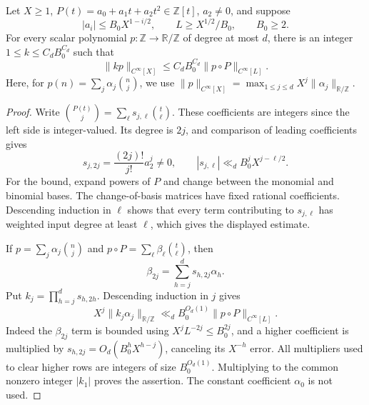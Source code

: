\begin{lemma}\label{lem:gn-quadratic-coefficients}
Let $X\geq1$, $P(t)=a_0+a_1t+a_2t^2\in\mathbb Z[t]$, $a_2\ne0$, and suppose
\[
 |a_i|\leq B_0X^{1-i/2},\qquad
 L\geq X^{1/2}/B_0,\qquad B_0\geq2.
\]
For every scalar polynomial $p:\mathbb Z\to\mathbb R/\mathbb Z$ of
degree at most $d$, there is an integer $1\leq k\leq C_dB_0^{C_d}$ such
that
\[
 \|kp\|_{C^\infty[X]}
   \leq C_dB_0^{C_d}\|p\circ P\|_{C^\infty[L]}.
\]
Here, for $p(n)=\sum_j\alpha_j\binom nj$, we use
$\|p\|_{C^\infty[X]}=\max_{1\leq j\leq d}X^j
\|\alpha_j\|_{\mathbb R/\mathbb Z}$.
\end{lemma}
\begin{proof}
Write $\binom{P(t)}j=\sum_\ell s_{j,\ell}\binom t\ell$. These
coefficients are integers since the left side is integer-valued. Its
degree is $2j$, and comparison of leading coefficients gives
\[
 s_{j,2j}=\frac{(2j)!}{j!}a_2^j\ne0,
 \qquad |s_{j,\ell}|\ll_d B_0^jX^{j-\ell/2}.
\]
For the bound, expand powers of $P$ and change between the monomial and
binomial bases. The change-of-basis matrices have fixed rational
coefficients. Descending induction in $\ell$ shows that every term
contributing to $s_{j,\ell}$ has weighted input degree at least $\ell$,
which gives the displayed estimate.

If $p=\sum_j\alpha_j\binom nj$ and
$p\circ P=\sum_\ell\beta_\ell\binom t\ell$, then
\[
 \beta_{2j}=\sum_{h=j}^d s_{h,2j}\alpha_h.
\]
Put $k_j=\prod_{h=j}^d s_{h,2h}$. Descending induction in $j$ gives
\[
 X^j\|k_j\alpha_j\|_{\mathbb R/\mathbb Z}
   \ll_d B_0^{O_d(1)}\|p\circ P\|_{C^\infty[L]}.
\]
Indeed the $\beta_{2j}$ term is bounded using
$X^jL^{-2j}\leq B_0^{2j}$, and a higher coefficient is multiplied by
$s_{h,2j}=O_d(B_0^hX^{h-j})$, canceling its $X^{-h}$ error.
All multipliers used to clear higher rows are integers of size
$B_0^{O_d(1)}$. Multiplying to the common nonzero integer $|k_1|$ proves
the assertion. The constant coefficient $\alpha_0$ is not used.
\end{proof}

